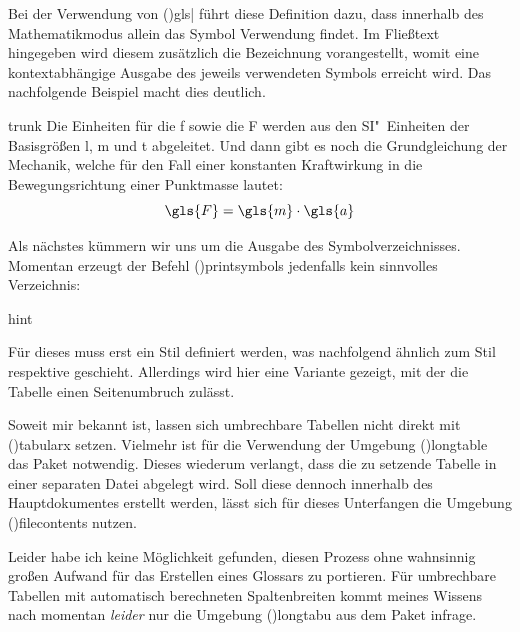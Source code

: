 \documentclass[%
  english,ngerman,%
  cdgeometry=no,DIV=12,%
  cd=false,cdfont=false,cdtitle=true,%
  headings=normal,%
  automark,%
  listof=toc,%
]{tudscrartcl}
\begin{document}
Bei der Verwendung von \Macro(){gls|} 
führt diese Definition dazu, dass innerhalb des Mathematikmodus allein das 
Symbol Verwendung findet. Im Fließtext hingegeben wird diesem zusätzlich die 
Bezeichnung vorangestellt, womit eine kontextabhängige Ausgabe des jeweils 
verwendeten Symbols erreicht wird. Das nachfolgende Beispiel macht dies 
deutlich.
%
\begin{Code}[input]{trunk}
Die Einheiten für die \gls{f} sowie die \gls{F} werden aus den
SI"~Einheiten der Basisgrößen \gls{l}, \gls{m} und \gls{t} abgeleitet.
Und dann gibt es noch die Grundgleichung der Mechanik, welche für den
Fall einer konstanten Kraftwirkung in die Bewegungsrichtung einer
Punktmasse lautet:
\[\gls{F} = \gls{m} \cdot \gls{a}\]

\end{Code}

Als nächstes kümmern wir uns um die Ausgabe des Symbolverzeichnisses. Momentan 
erzeugt der Befehl \Macro(){printsymbols} jedenfalls kein 
sinnvolles Verzeichnis:
%
\begin{Code}{hint}
\printsymbols
\end{Code}
\begin{quoting}[rightmargin=0pt]
\glsdisablehyper
\printsymbols[style=simple]
\end{quoting}

Für dieses muss erst ein Stil definiert werden, was nachfolgend ähnlich zum 
Stil  respektive  geschieht. Allerdings 
wird hier eine Variante gezeigt, mit der die Tabelle einen Seitenumbruch 
zulässt.



Soweit mir bekannt ist, lassen sich umbrechbare Tabellen nicht direkt mit 
\Environment(){tabularx} setzen. Vielmehr ist für die 
Verwendung der Umgebung \Environment(){longtable} das Paket 
 notwendig. Dieses wiederum verlangt, dass die zu setzende 
Tabelle in einer separaten Datei abgelegt wird. Soll diese dennoch innerhalb 
des Hauptdokumentes erstellt werden, lässt sich für dieses Unterfangen die 
Umgebung \Environment(){filecontents} nutzen.

Leider habe ich keine Möglichkeit gefunden, diesen Prozess ohne wahnsinnig 
großen Aufwand für das Erstellen eines Glossars zu portieren. Für umbrechbare 
Tabellen mit automatisch berechneten Spaltenbreiten kommt meines Wissens nach 
momentan \emph{leider} nur die Umgebung \Environment(){longtabu} 
aus dem Paket  infrage.
\end{document}
